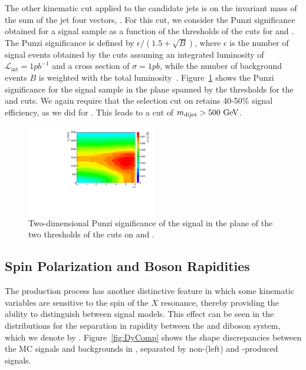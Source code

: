 The other kinematic cut applied to the \VBF candidate jets is on the invariant mass of the sum of the \VBF jet four vectors, \mjjVBF.
For this cut, we consider the Punzi significance obtained for a \VBF signal sample as a function of the thresholds of the cuts for \DetaVBF and \mjjVBF.
The Punzi significance is defined by $\epsilon/(1.5+\sqrt{B})$, where $\epsilon$ is the number of signal events obtained by the cuts assuming an integrated luminosity of $\mathcal{L}_\mathrm{int}=1\unit{pb^{-1}}$ and a cross section of $\sigma=1\unit{pb}$, while the number of background events $B$ is weighted with the total luminosity~\cite{Punzi:2003bu}.
Figure~\ref{fig:detaMjjSB_VBF} shows the Punzi significance for the \VBF\RadtoWW signal sample in the plane spanned by the thresholds for the \DetaVBF and \mjjVBF cuts.
We again require that the selection cut on \mjjVBF retains 40-50\% signal efficiency, as we did for \DetaVBF.
This leads to a cut of $\mjjVBF>500\unit{GeV}$.

\begin{figure}[htbp]
  \centering
  \includegraphics[width=0.5\textwidth]{fig/analysis/detaMjjSB.pdf}
  \caption{
    Two-dimensional Punzi significance of the \VBF\RadtoWW signal in the plane of the two thresholds of the cuts on \DetaVBF and \mjjVBF.
  }
  \label{fig:detaMjjSB_VBF}
\end{figure}

\subsection{Spin Polarization and Boson Rapidities}
\label{subsec:spinPol}

The \VBF production process has another distinctive feature in which some kinematic variables are sensitive to the spin of the $X$ resonance, thereby providing the ability to distinguish between signal models.
This effect can be seen in the distributions for the separation in rapidity between the \Vhad and \Wlep diboson system, which we denote by \Dy.
Figure~\ref{fig:DyComp} shows the shape discrepancies between the MC signals and backgrounds in \Dy, separated by non-\VBF (left) and \VBF-produced signals.

